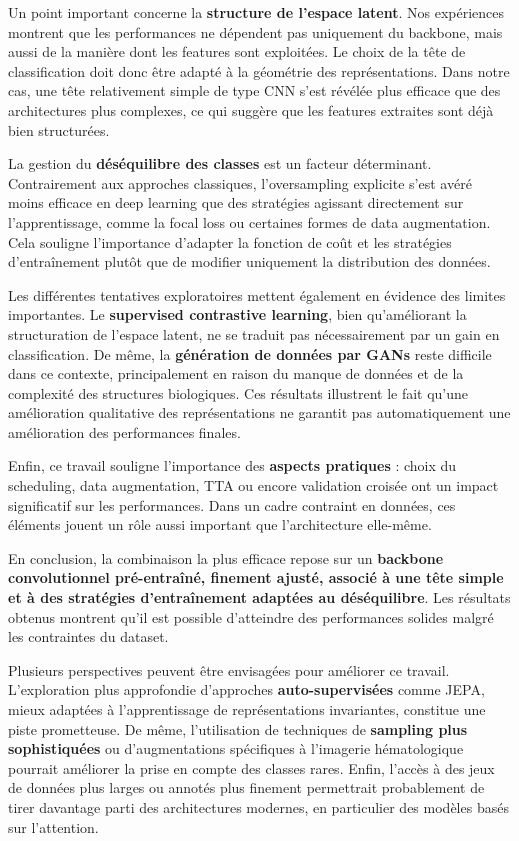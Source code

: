 \documentclass[journal,twocolumn]{IEEEtran}
\begin{document}
Un point important concerne la \textbf{structure de l’espace latent}. Nos expériences montrent que les performances ne dépendent pas uniquement du backbone, mais aussi de la manière dont les features sont exploitées. Le choix de la tête de classification doit donc être adapté à la géométrie des représentations. Dans notre cas, une tête relativement simple de type CNN s’est révélée plus efficace que des architectures plus complexes, ce qui suggère que les features extraites sont déjà bien structurées.

La gestion du \textbf{déséquilibre des classes} est un facteur déterminant. Contrairement aux approches classiques, l’oversampling explicite s’est avéré moins efficace en deep learning que des stratégies agissant directement sur l’apprentissage, comme la focal loss ou certaines formes de data augmentation. Cela souligne l’importance d’adapter la fonction de coût et les stratégies d’entraînement plutôt que de modifier uniquement la distribution des données.

Les différentes tentatives exploratoires mettent également en évidence des limites importantes. Le \textbf{supervised contrastive learning}, bien qu’améliorant la structuration de l’espace latent, ne se traduit pas nécessairement par un gain en classification. De même, la \textbf{génération de données par GANs} reste difficile dans ce contexte, principalement en raison du manque de données et de la complexité des structures biologiques. Ces résultats illustrent le fait qu’une amélioration qualitative des représentations ne garantit pas automatiquement une amélioration des performances finales.

Enfin, ce travail souligne l’importance des \textbf{aspects pratiques} : choix du scheduling, data augmentation, TTA ou encore validation croisée ont un impact significatif sur les performances. Dans un cadre contraint en données, ces éléments jouent un rôle aussi important que l’architecture elle-même.

En conclusion, la combinaison la plus efficace repose sur un \textbf{backbone convolutionnel pré-entraîné, finement ajusté, associé à une tête simple et à des stratégies d’entraînement adaptées au déséquilibre}. Les résultats obtenus montrent qu’il est possible d’atteindre des performances solides malgré les contraintes du dataset.

Plusieurs perspectives peuvent être envisagées pour améliorer ce travail. L’exploration plus approfondie d’approches \textbf{auto-supervisées} comme JEPA, mieux adaptées à l’apprentissage de représentations invariantes, constitue une piste prometteuse. De même, l’utilisation de techniques de \textbf{sampling plus sophistiquées} ou d’augmentations spécifiques à l’imagerie hématologique pourrait améliorer la prise en compte des classes rares. Enfin, l’accès à des jeux de données plus larges ou annotés plus finement permettrait probablement de tirer davantage parti des architectures modernes, en particulier des modèles basés sur l’attention.





\end{document}
